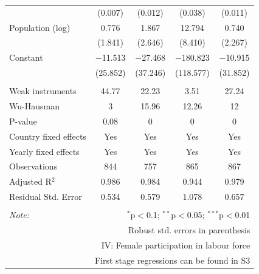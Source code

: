 \documentclass[10pt,letterpaper]{article}
\begin{document}
\begin{table}[!htbp]
\begin{tabular}{@{\extracolsep{1pt}}lcccc}
  & (0.007) & (0.012) & (0.038) & (0.011) \\ 
  Population (log) & 0.776 & 1.867 & 12.794 & 0.740 \\ 
  & (1.841) & (2.646) & (8.410) & (2.267) \\ 
  Constant & $-$11.513 & $-$27.468 & $-$180.823 & $-$10.915 \\ 
  & (25.852) & (37.246) & (118.577) & (31.852) \\ 
 \hline \\[-1.8ex] 
Weak instruments & 44.77 & 22.23 & 3.51 & 27.24 \\ 
Wu-Hausman & 3 & 15.96 & 12.26 & 12 \\ 
P-value & 0.08 & 0 & 0 & 0 \\ 
Country fixed effects & Yes & Yes & Yes & Yes \\ 
Yearly fixed effects & Yes & Yes & Yes & Yes \\ 
Observations & 844 & 757 & 865 & 867 \\ 
Adjusted R$^{2}$ & 0.986 & 0.984 & 0.944 & 0.979 \\ 
Residual Std. Error & 0.534 & 0.579 & 1.078 & 0.657 \\ 
\hline 
\hline \\[-1.8ex] 
\textit{Note:}  & \multicolumn{4}{r}{$^{*}$p$<$0.1; $^{**}$p$<$0.05; $^{***}$p$<$0.01} \\ 
 & \multicolumn{4}{r}{Robust std. errors in parenthesis} \\ 
 & \multicolumn{4}{r}{IV: Female participation in labour force} \\ 
 & \multicolumn{4}{r}{First stage regressions can be found in S3} \\ 
\end{tabular} 
\end{table}
\end{document}
